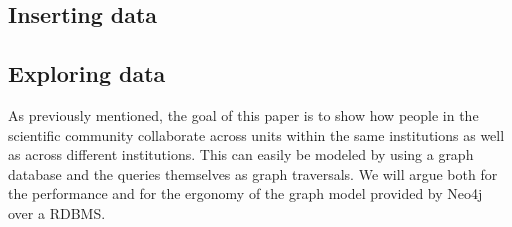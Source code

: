 \subsection*{Inserting data}


\subsection*{Exploring data}
As previously mentioned, the goal of this paper is to show how people in the scientific community collaborate across units within the same institutions as well as across different institutions.
This can easily be modeled by using a graph database and the queries themselves as graph traversals.
We will argue both for the performance and for the ergonomy of the graph model provided by Neo4j over a RDBMS.
